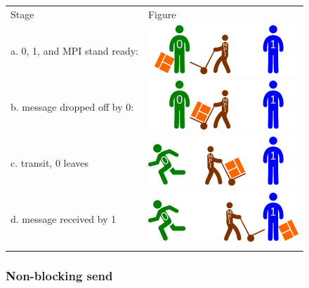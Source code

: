 \begin{longtable}[c]{@{}ll@{}}
\toprule\addlinespace
Stage & Figure
\\\addlinespace
\midrule\endhead
a. 0, 1, and MPI stand ready: &
\includegraphics{06MPI/figures/sync0.png}
\\\addlinespace
b. message dropped off by 0: & \includegraphics{06MPI/figures/sync1.png}
\\\addlinespace
c. transit, 0 leaves & \includegraphics{06MPI/figures/ssyncT.png}
\\\addlinespace
d. message received by 1 & \includegraphics{06MPI/figures/ssyncA.png}
\\\addlinespace
\bottomrule
\end{longtable}

\subsubsection{Non-blocking send}\label{non-blocking-send}

